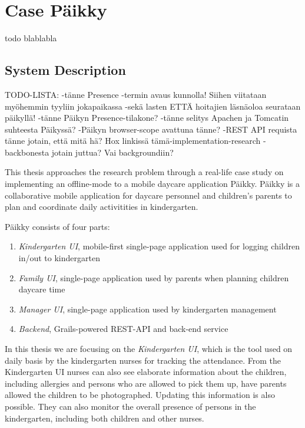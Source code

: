 
\chapter{Case Päikky}
todo blablabla


\section{System Description}
TODO-LISTA:
-tänne Presence -termin avaus kunnolla! Siihen viitataan myöhemmin tyyliin jokapaikassa
-sekä lasten ETTÄ hoitajien läsnäoloa seurataan päikyllä!
-tänne Päikyn Presence-tilakone?
-tänne selitys Apachen ja Tomcatin suhteesta Päikyssä?
-Päikyn browser-scope avattuna tänne?
-REST API requista tänne jotain, että mitä hä? Hox linkissä tämä-implementation-research
-backbonesta jotain juttua? Vai backgroundiin?

This thesis approaches the research problem through a real-life case study on implementing an offline-mode to a mobile daycare application Päikky. Päikky is a collaborative mobile application for daycare personnel and children's parents to plan and coordinate daily activitities in kindergarten. 


Päikky consists of four parts:

\begin{enumerate}
	\item \textit{Kindergarten UI}, mobile-first single-page application used for logging children in/out to kindergarten
	\item \textit{Family UI}, single-page application used by parents when planning children daycare time
	\item \textit{Manager UI}, single-page application used by kindergarten management 
	\item \textit{Backend}, Grails-powered REST-API and back-end service
\end{enumerate}

\noindent In this thesis we are focusing on the \textit{Kindergarten UI}, which is the tool used on daily basis by the kindergarten nurses for tracking the attendance. From the Kindergarten UI nurses can also see elaborate information about the children, including allergies and persons who are allowed to pick them up, have parents allowed the children to be photographed. Updating this information is also possible. They can also monitor the overall presence of persons in the kindergarten, including both children and other nurses.


